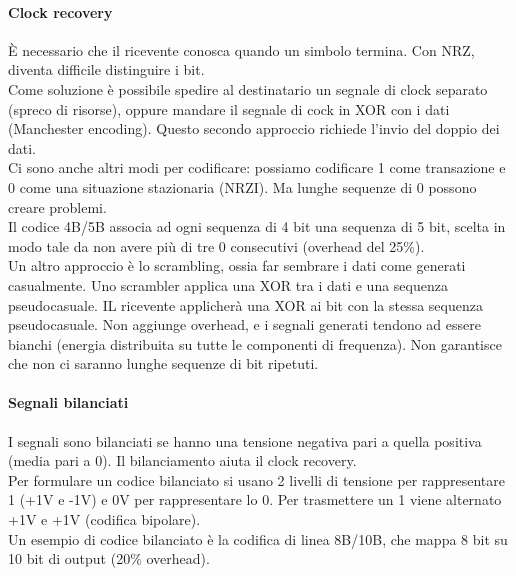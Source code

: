 \documentclass{article}
\begin{document}
		\paragraph{Clock recovery} 
		È necessario che il ricevente conosca quando un simbolo termina. Con NRZ, diventa difficile distinguire i bit. \\ Come soluzione è possibile spedire al destinatario un segnale di clock separato (spreco di risorse), oppure mandare il segnale di cock in XOR con i dati (Manchester encoding). Questo secondo approccio richiede l'invio del doppio dei dati.\\
		Ci sono anche altri modi per codificare: possiamo codificare 1 come transazione e 0 come una situazione stazionaria (NRZI). Ma lunghe sequenze di 0 possono creare problemi. \\
		Il codice 4B/5B associa ad ogni sequenza di 4 bit una sequenza di 5 bit, scelta in modo tale da non avere più di tre 0 consecutivi (overhead del 25\%).\\
		Un altro approccio è lo scrambling, ossia far sembrare i dati come generati casualmente. Uno scrambler applica una XOR tra i dati e una sequenza pseudocasuale. IL ricevente applicherà una XOR ai bit con la stessa sequenza pseudocasuale. Non aggiunge overhead, e i segnali generati tendono ad essere bianchi (energia distribuita su tutte le componenti di frequenza). Non garantisce che non ci saranno lunghe sequenze di bit ripetuti.\\
		\paragraph{Segnali bilanciati}
		I segnali sono bilanciati se hanno una tensione negativa pari a quella positiva (media pari a 0).
		Il bilanciamento aiuta il clock recovery.\\
		Per formulare un codice bilanciato si usano 2 livelli di tensione per rappresentare 1 (+1V e -1V) e 0V per rappresentare lo 0. Per trasmettere un 1 viene alternato +1V e +1V (codifica bipolare).\\
		Un esempio di codice bilanciato è la codifica di linea 8B/10B, che mappa 8 bit su 10 bit di output (20\% overhead). \\
\end{document}
